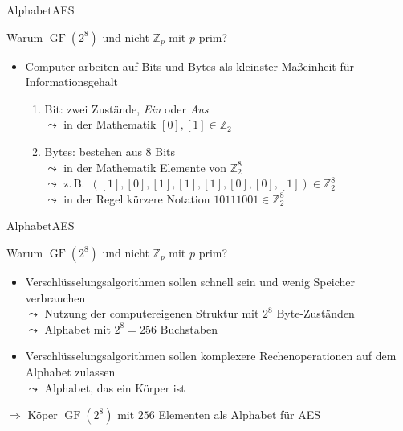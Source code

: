 \documentclass{beamer}
\newcommand{\Z}{\mathbb{Z}}
\newcommand{\GF}{\operatorname{GF}}
\newcommand{\ol}[1]{[#1]}
\theoremstyle{plain}
\begin{document}
\begin{frame}{Alphabet}{AES}
 
 \begin{block}{Warum $\GF(2^8)$ und nicht $\Z_p$ mit $p$ prim?}
  \begin{itemize}
   \item Computer arbeiten auf Bits und Bytes als kleinster Maßeinheit für Informationsgehalt
   \begin{enumerate}
    \item Bit: zwei Zustände, \emph{Ein} oder \emph{Aus}\\
    $\leadsto$ in der Mathematik $[0], [1] \in \Z_2$\\
    \item Bytes: bestehen aus $8$ Bits\\
    $\leadsto$ in der Mathematik Elemente von $\Z_2^8$\\
    $\leadsto$ z.\,B.~$(\ol 1, \ol 0, \ol 1, \ol 1, \ol 1, \ol 0, \ol 0, \ol 1) \in \Z_2^8$\\
    $\leadsto$ in der Regel kürzere Notation $10111001 \in \Z_2^8$
   \end{enumerate}
  \end{itemize}
 \end{block}
\end{frame}


\begin{frame}{Alphabet}{AES}
 
 \begin{block}{Warum $\GF(2^8)$ und nicht $\Z_p$ mit $p$ prim?}
  \begin{itemize}[<+->]
   \item Verschlüsselungsalgorithmen sollen schnell sein und wenig Speicher verbrauchen\\
   $\leadsto$ Nutzung der computereigenen Struktur mit $2^8$ Byte-Zuständen\\
   $\leadsto$ Alphabet mit $2^8 = 256$ Buchstaben
   \item Verschlüsselungsalgorithmen sollen komplexere Rechenoperationen auf dem Alphabet zulassen\\
   $\leadsto$ Alphabet, das ein Körper ist
  \end{itemize}
  \medskip
  \pause
  $\Rightarrow$  Köper $\GF(2^8)$ mit $256$ Elementen als Alphabet für AES
 \end{block}
\end{frame}
\end{document}

